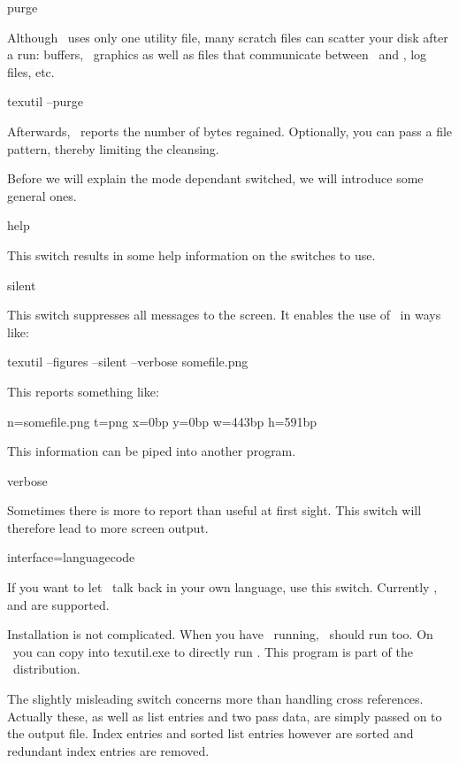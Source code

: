 {{{{\switch purge  

Although \CONTEXT\ uses only one utility file, many scratch files can scatter
your disk after a run: buffers, \METAPOST\ graphics as well as files that 
communicate between \CONTEXT\ and \METAPOST, log files, etc. 

\starttyping
texutil  --purge 
\stoptyping 

Afterwards, \TEXUTIL\ reports the number of bytes regained. Optionally, you
can pass a file pattern, thereby limiting the cleansing. 

\subject {Switches} 

Before we will explain the mode dependant switched, we will introduce some
general ones. 

\switch help 

This switch results in some help information on the switches to use. 

\switch silent

This switch suppresses all messages to the screen. It enables the use of
\TEXUTIL\ in ways like: 

\starttyping
texutil  --figures  --silent --verbose somefile.png 
\stoptyping 

This reports something like:  

\starttyping
n=somefile.png t=png x=0bp y=0bp w=443bp h=591bp
\stoptyping 

This information can be piped into another program. 

\switch verbose

Sometimes there is more to report than useful at first sight. This switch
will therefore lead to more screen output. 

\switch interface=languagecode

If you want to let \TEXUTIL\ talk back in your own language, use this switch.
Currently ,  and  are supported. 

\subject {Installation} 

Installation is not complicated. When you have \PERL\ running, \TEXUTIL\
should run too. On \MSWINDOWS\ you can copy  into \type
{texutil.exe} to directly run \TEXUTIL. This program is part of the \FPTEX\
distribution. 

\subject {References}

The slightly misleading switch  concerns more than
handling cross references. Actually these, as well as list entries and two
pass data, are simply passed on to the output file. Index entries and sorted
list entries however are sorted and redundant index entries are removed. 

}}}}
